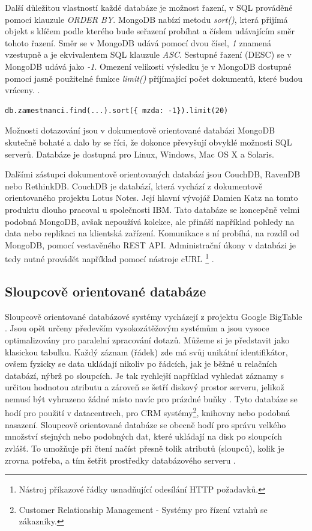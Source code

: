 Další důležitou vlastností každé databáze je možnost řazení, v SQL prováděné pomocí klauzule \emph{ORDER BY}. MongoDB nabízí metodu \emph{sort()}, která přijímá objekt s klíčem podle kterého bude seřazení probíhat a číslem udávajícím směr tohoto řazení. Směr se v MongoDB udává pomocí dvou čísel, \emph{1} znamená vzestupně a je ekvivalentem SQL klauzule \emph{ASC}. Sestupné řazení (DESC) se v MongoDB udává jako \emph{-1}. Omezení velikosti výsledku je v MongoDB dostupné pomocí jasně použitelné funkce \emph{limit()} příjímající počet dokumentů, které budou vráceny. \cite{mongoDocs}. 

\begin{lstlisting}[caption={Ukázka sestupného řazení podle mzdy a omezení v MongoDB}]
db.zamestnanci.find(...).sort({ mzda: -1}).limit(20)
\end{lstlisting}
Možnosti dotazování jsou v dokumentově orientované databázi MongoDB skutečně bohaté a dalo by se  říci, že dokonce převyšují obvyklé možnosti SQL serverů. Databáze je dostupná pro Linux, Windows, Mac OS X a Solaris.

Dalšími zástupci dokumentově orientovaných databází jsou CouchDB,  RavenDB nebo RethinkDB.
CouchDB je databází, která vychází z dokumentově orientovaného projektu Lotus Notes. Její hlavní vývojář Damien Katz na tomto produktu dlouho pracoval u společnosti IBM. Tato databáze se koncepčně velmi podobná MongoDB, avšak nepoužívá kolekce, ale přináší například pohledy na data nebo replikaci na klientská zařízení. Komunikace s ní probíhá, na rozdíl od MongoDB, pomocí vestavěného REST API. Administrační úkony v databázi je tedy nutné provádět například pomocí nástroje cURL \footnote{Nástroj příkazové řádky usnadňující odesílání HTTP požadavků.} \cite{strauchNosql}.
\subsection{Sloupcově orientované databáze}
Sloupcově orientované databázové systémy vycházejí z projektu Google BigTable  \cite{changBigtable}. Jsou opět určeny především vysokozátěžovým systémům a jsou vysoce optimalizovány pro paralelní zpracování dotazů. Můžeme si je představit jako klasickou tabulku. Každý záznam (řádek) zde má svůj unikátní identifikátor, ovšem fyzicky se data ukládají nikoliv po řádcích, jak je běžné u relačních databází, nýbrž po sloupcích. Je tak rychlejší například vyhledat záznamy s určitou hodnotou atributu a zároveň se šetří diskový prostor serveru, jelikož nemusí být vyhrazeno žádné místo navíc pro prázdné buňky \cite{regnerVse}.
Tyto databáze se hodí pro použití v datacentrech, pro CRM systémy\footnote{Customer Relationship Management - Systémy pro řízení vztahů se zákazníky.}, knihovny nebo podobná nasazení. Sloupcově orientované databáze se obecně hodí pro správu velkého množství stejných nebo podobných dat, které ukládají na disk po sloupcích zvlášť. To umožňuje při čtení načíst přesně tolik atributů (sloupců), kolik je zrovna potřeba, a tím šetřit prostředky databázového serveru \cite{columnDB}. 

